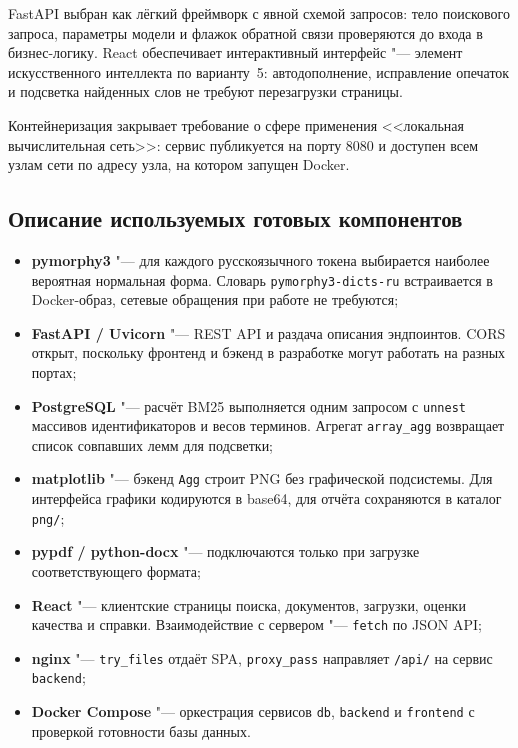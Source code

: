 FastAPI выбран как лёгкий фреймворк с явной схемой запросов: тело поискового запроса, параметры модели и флажок обратной связи проверяются до входа в бизнес-логику. React обеспечивает интерактивный интерфейс "--- элемент искусственного интеллекта по варианту~5: автодополнение, исправление опечаток и подсветка найденных слов не требуют перезагрузки страницы.

Контейнеризация закрывает требование о сфере применения <<локальная вычислительная сеть>>: сервис публикуется на порту 8080 и доступен всем узлам сети по адресу узла, на котором запущен Docker.

\subsection{Описание используемых готовых компонентов}

\begin{itemize}
	\item \textbf{pymorphy3} "--- для каждого русскоязычного токена выбирается наиболее вероятная нормальная форма. Словарь \texttt{pymorphy3-dicts-ru} встраивается в Docker-образ, сетевые обращения при работе не требуются;
	\item \textbf{FastAPI / Uvicorn} "--- REST API и раздача описания эндпоинтов. CORS открыт, поскольку фронтенд и бэкенд в разработке могут работать на разных портах;
	\item \textbf{PostgreSQL} "--- расчёт BM25 выполняется одним запросом с \texttt{unnest} массивов идентификаторов и весов терминов. Агрегат \texttt{array\_agg} возвращает список совпавших лемм для подсветки;
	\item \textbf{matplotlib} "--- бэкенд \texttt{Agg} строит PNG без графической подсистемы. Для интерфейса графики кодируются в base64, для отчёта сохраняются в каталог \texttt{png/};
	\item \textbf{pypdf / python-docx} "--- подключаются только при загрузке соответствующего формата;
	\item \textbf{React} "--- клиентские страницы поиска, документов, загрузки, оценки качества и справки. Взаимодействие с сервером "--- \texttt{fetch} по JSON API;
	\item \textbf{nginx} "--- \texttt{try\_files} отдаёт SPA, \texttt{proxy\_pass} направляет \texttt{/api/} на сервис \texttt{backend};
	\item \textbf{Docker Compose} "--- оркестрация сервисов \texttt{db}, \texttt{backend} и \texttt{frontend} с проверкой готовности базы данных.
\end{itemize}

